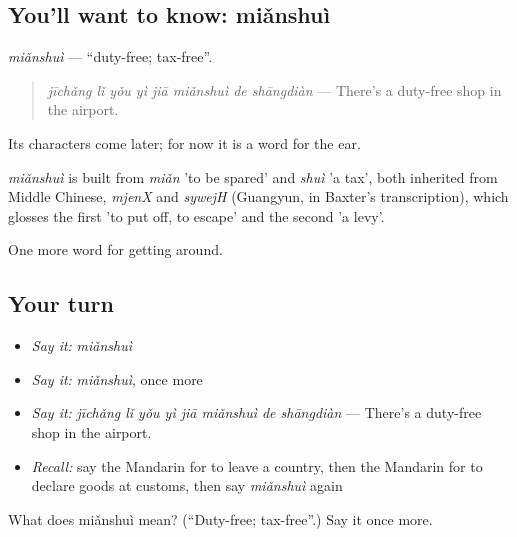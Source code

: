 \subsection*{You'll want to know: miǎnshuì}
\emph{miǎnshuì} — \textquotedblleft{}duty-free; tax-free\textquotedblright{}.

\begin{quote}
\emph{jīchǎng lǐ yǒu yì jiā miǎnshuì de shāngdiàn} — There's a duty-free shop in the airport.
\end{quote}

Its characters come later; for now it is a word for the ear.

\begin{cousinweb}
\emph{miǎnshuì} is built from \emph{miǎn} 'to be spared' and \emph{shuì} 'a tax', both inherited from Middle Chinese, \emph{mjenX} and \emph{sywejH} (Guangyun, in Baxter's transcription), which glosses the first 'to put off, to escape' and the second 'a levy'.
\end{cousinweb}

\begin{grammarlens}[title={What you've built}]
One more word for getting around.
\end{grammarlens}

\subsection*{Your turn}
\begin{itemize}
\raggedright
  \item \emph{Say it:} \emph{miǎnshuì}
  \item \emph{Say it:} \emph{miǎnshuì}, once more
  \item \emph{Say it:} \emph{jīchǎng lǐ yǒu yì jiā miǎnshuì de shāngdiàn} — There's a duty-free shop in the airport.
  \item \emph{Recall:} say the Mandarin for to leave a country, then the Mandarin for to declare goods at customs, then say \emph{miǎnshuì} again
\end{itemize}

\begin{tcolorbox}[breakable,colback=teal!4,colframe=teal!35!black,title={Before you move on}]
What does miǎnshuì mean? (\textquotedblleft{}Duty-free; tax-free\textquotedblright{}.) Say it once more.
\end{tcolorbox}
